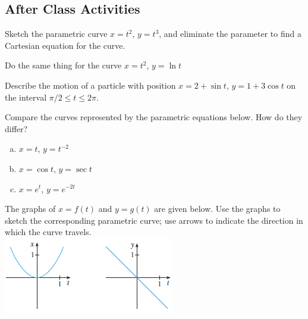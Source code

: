 \documentclass[notes2924]{subfiles}
\begin{document}
	\subsection*{After Class Activities}
		\begin{ex}
			Sketch the parametric curve $x = t^2$, $y = t^3$, and eliminate the parameter to find a Cartesian equation for the curve.
		\end{ex}
			
		\begin{ex}
			Do the same thing for the curve $x = t^2$, $y = \ln t$
		\end{ex}
			
		\begin{ex}
			Describe the motion of a particle with position $x = 2 + \sin t$, $y = 1 + 3\cos t$ on the interval $\pi/2\leq t\leq 2\pi$.  
		\end{ex}
			\newpage
			
		\begin{ex}
			Compare the curves represented by the parametric equations below.  How do they differ?
			\begin{enumerate}[(a)]
				\item $x = t$, $y = t^{-2}$
				\item $x = \cos t$, $y = \sec t$
				\item $x = e^t$, $y = e^{-2t}$
			\end{enumerate}
		\end{ex}
			
		\begin{ex}
			The graphs of $x = f(t)$ and $y = g(t)$ are given below.  Use the graphs to sketch the corresponding parametric curve; use arrows to indicate the direction in which the curve travels.\\
			\includegraphics[scale = 1.25]{101_2.png}
		\end{ex}
	
\clearpage
\end{document}
